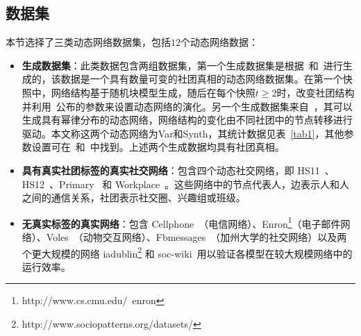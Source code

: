 \subsection{数据集}
本节选择了三类动态网络数据集，包括$12$个动态网络数据：
\begin{itemize}
    \item \textbf{生成数据集}：此类数据包含两组数据集，第一个生成数据集是根据~\cite{kim2009particle}和~\cite{Lin.2009.Tseng}进行生成的，该数据是一个具有数量可变的社团真相的动态网络数据集。在第一个快照中，网络结构基于随机块模型生成，随后在每个快照$t \ge 2$时，改变社团结构并利用~\cite{Lin.2009.Tseng}公布的参数来设置动态网络的演化。另一个生成数据集来自~\cite{ditursi2017local}，其可以生成具有幂律分布的动态网络，网络结构的变化由不同社团中的节点转移进行驱动。本文称这两个动态网络为Var和Synth，其统计数据见表~\ref{tab1}，其他参数设置可在~\cite{kim2009particle}和~\cite{Lin.2009.Tseng}中找到。上述两个生成数据均具有社团真相。
    \item \textbf{具有真实社团标签的真实社交网络}：包含四个动态社交网络，即 HS11~\cite{stehle2011high}、HS12~\cite{stehle2011high}、Primary~\cite{stehle2011high} 和 Workplace~\cite{genois2014data}。这些网络中的节点代表人，边表示人和人之间的通信关系，社团表示社交圈、兴趣组或班级。
    \item \textbf{无真实标签的真实网络}：包含 Cellphone~\cite{folino2013evolutionary}（电信网络）、Enron\footnote{http://www.cs.cmu.edu/~enron}（电子邮件网络）、Voles~\cite{rossi2015network}（动物交互网络）、Fbmessages~\cite{rossi2015network}（加州大学的社交网络）以及两个更大规模的网络 iadublin\footnote{http://www.sociopatterns.org/datasets/} 和 soc-wiki~\cite{rossi2015network}用以验证各模型在较大规模网络中的运行效率。
\end{itemize}

